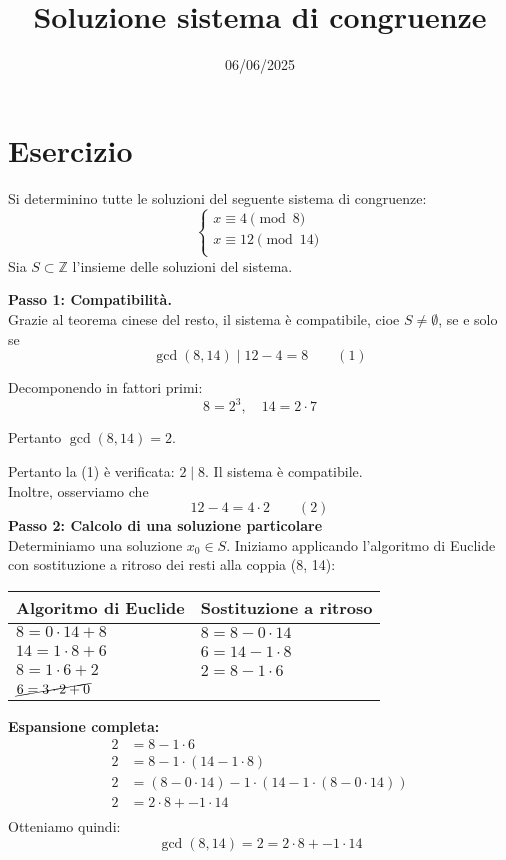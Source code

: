 \documentclass[12pt]{article}
\begin{document}
\title{Soluzione sistema di congruenze}
\date{06/06/2025}
\maketitle
\section*{Esercizio}
Si determinino tutte le soluzioni del seguente sistema di congruenze:
\[
\begin{cases}
x \equiv 4 \pmod{8} \\
x \equiv 12 \pmod{14} \\
\end{cases}
\]
Sia $S \subset \mathbb{Z}$ l'insieme delle soluzioni del sistema.

\textbf{Passo 1: Compatibilità.} \\ 
Grazie al teorema cinese del resto, il sistema è compatibile, cioe $S \neq \emptyset$, se e solo se
$$\gcd(8, 14) \mid 12 - 4 = 8 \qquad (1)$$

Decomponendo in fattori primi:
$$8 = 2^{3}, \quad 14 = 2 \cdot 7$$

Pertanto $\gcd(8, 14) = 2$.

Pertanto la (1) è verificata: $2 \mid 8$. Il sistema è compatibile.\\
Inoltre, osserviamo che $$12 - 4 = 4 \cdot 2 \qquad (2)$$
\textbf{Passo 2: Calcolo di una soluzione particolare} \\
Determiniamo una soluzione $x_0 \in S$.
Iniziamo applicando l'algoritmo di Euclide con sostituzione a ritroso dei resti alla coppia (8, 14):
\begin{center}
\setlength{\arrayrulewidth}{0.5pt}
\begin{tabular}{|p{5cm}|p{9cm}|}
\hline
\textbf{Algoritmo di Euclide} & \textbf{Sostituzione a ritroso} \\
\hline
$8 = 0 \cdot  14 + 8$ & $8 = 8 - 0 \cdot  14$ \\
\hline
$14 = 1 \cdot  8 + 6$ & $6 = 14 - 1 \cdot  8$ \\
\hline
$8 = 1 \cdot  6 + 2$ & $2 = 8 - 1 \cdot  6$ \\
\hline
$\cancel{6 = 3 \cdot  2 + 0}$ & \\
\hline
\end{tabular}
\end{center}
\textbf{Espansione completa:}
\begin{align*}
2 &= 8 - 1\cdot6\\
2 &= 8 - 1\cdot(14 - 1\cdot8)\\
2 &= (8 - 0\cdot14) - 1\cdot(14 - 1\cdot(8 - 0\cdot14))\\
2 &= 2\cdot8 + -1\cdot14\\
\end{align*}
Otteniamo quindi: $$\gcd(8, 14) = 2 = 2 \cdot 8 + -1 \cdot 14$$
\end{document}

